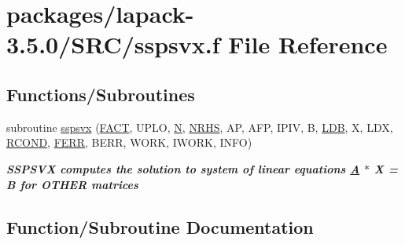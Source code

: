 \hypertarget{sspsvx_8f}{}\section{packages/lapack-\/3.5.0/\+S\+R\+C/sspsvx.f File Reference}
\label{sspsvx_8f}
\subsection*{Functions/\+Subroutines}
\begin{DoxyCompactItemize}
\item 
subroutine \hyperlink{sspsvx_8f_a52467870da59d888cefe37e1ca7960ed}{sspsvx} (\hyperlink{superlu__enum__consts_8h_af00a42ecad444bbda75cde1b64bd7e72a1b6692b56d378abb85bd49063721d034}{F\+A\+C\+T}, U\+P\+L\+O, \hyperlink{polmisc_8c_a0240ac851181b84ac374872dc5434ee4}{N}, \hyperlink{example__user_8c_aa0138da002ce2a90360df2f521eb3198}{N\+R\+H\+S}, A\+P, A\+F\+P, I\+P\+I\+V, B, \hyperlink{example__user_8c_a50e90a7104df172b5a89a06c47fcca04}{L\+D\+B}, X, L\+D\+X, \hyperlink{superlu__enum__consts_8h_af00a42ecad444bbda75cde1b64bd7e72a9b5c151728d8512307565994c89919d5}{R\+C\+O\+N\+D}, \hyperlink{superlu__enum__consts_8h_af00a42ecad444bbda75cde1b64bd7e72a78fd14d7abebae04095cfbe02928f153}{F\+E\+R\+R}, B\+E\+R\+R, W\+O\+R\+K, I\+W\+O\+R\+K, I\+N\+F\+O)
\begin{DoxyCompactList}\small\item\em {\bfseries  S\+S\+P\+S\+V\+X computes the solution to system of linear equations \hyperlink{classA}{A} $\ast$ X = B for O\+T\+H\+E\+R matrices} \end{DoxyCompactList}\end{DoxyCompactItemize}


\subsection{Function/\+Subroutine Documentation}
\hypertarget{sspsvx_8f_a52467870da59d888cefe37e1ca7960ed}{}
